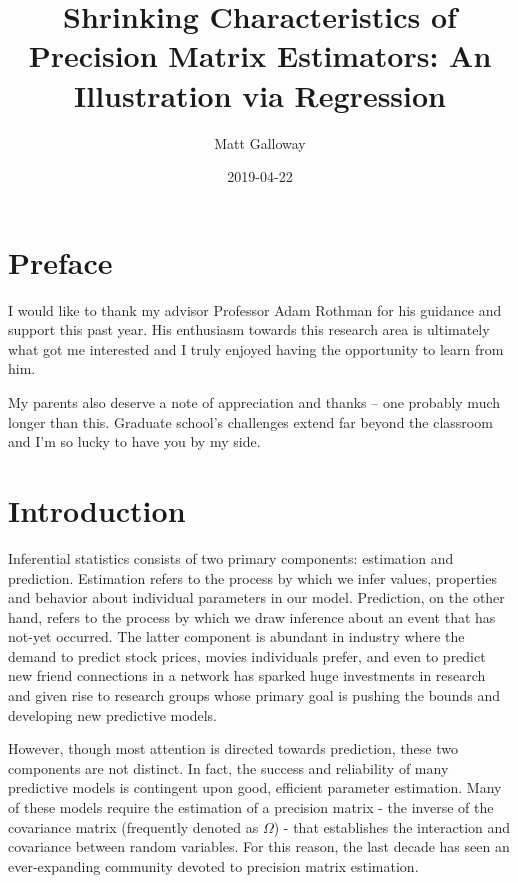 \documentclass[11pt,]{report}
\title{Shrinking Characteristics of Precision Matrix Estimators: An Illustration via Regression}
\author{Matt Galloway}
\date{2019-04-22}
\theoremstyle{definition}
\theoremstyle{definition}
\theoremstyle{definition}
\theoremstyle{remark}
\begin{document}
\maketitle

{
\hypersetup{linkcolor=}
\setcounter{tocdepth}{1}
\tableofcontents
}
\hypertarget{preface}{%
\chapter*{Preface}\label{preface}}


I would like to thank my advisor Professor Adam Rothman for his guidance and support this past year. His enthusiasm towards this research area is ultimately what got me interested and I truly enjoyed having the opportunity to learn from him.

My parents also deserve a note of appreciation and thanks -- one probably much longer than this. Graduate school's challenges extend far beyond the classroom and I'm so lucky to have you by my side.

\hypertarget{intro}{%
\chapter{Introduction}\label{intro}}

Inferential statistics consists of two primary components: estimation and prediction. Estimation refers to the process by which we infer values, properties and behavior about individual parameters in our model. Prediction, on the other hand, refers to the process by which we draw inference about an event that has not-yet occurred. The latter component is abundant in industry where the demand to predict stock prices, movies individuals prefer, and even to predict new friend connections in a network has sparked huge investments in research and given rise to research groups whose primary goal is pushing the bounds and developing new predictive models.

However, though most attention is directed towards prediction, these two components are not distinct. In fact, the success and reliability of many predictive models is contingent upon good, efficient parameter estimation. Many of these models require the estimation of a precision matrix - the inverse of the covariance matrix (frequently denoted as \(\Omega\)) - that establishes the interaction and covariance between random variables. For this reason, the last decade has seen an ever-expanding community devoted to precision matrix estimation.
\end{document}
